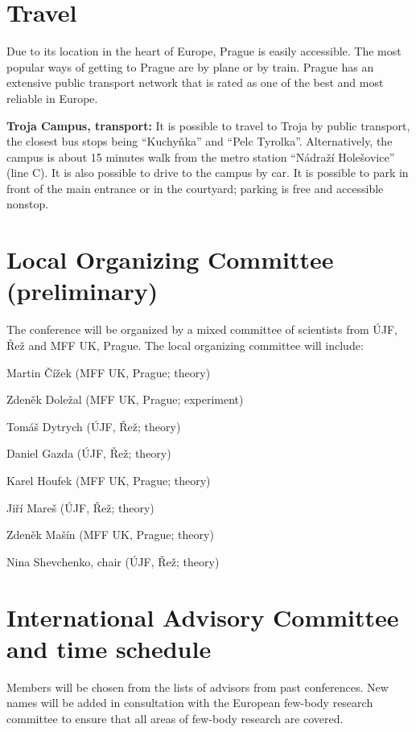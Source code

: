 \documentclass[12pt]{extarticle}
\newcommand{\dg}[1]{\todo[inline]{DG: #1}}
\newcommand*\sq{\mathbin{\vcenter{\hbox{\rule{.8ex}{.8ex}}}}}
\newenvironment{t_sq_itemize}
{\begin{itemize}[topsep=0pt, parsep=0pt, itemsep=0pt, leftmargin=*]
    \renewcommand{\labelitemi}{{\(\sq\)}}}
  {\end{itemize}}
\begin{document}
\section*{Travel}
\noindent
%
Due to its location in the heart of Europe, Prague is easily
accessible. The most popular ways of getting to Prague are by plane or
by train. Prague has an extensive public transport network that is
rated as one of the best and most reliable in Europe.

{\bf Troja Campus, transport:} It is possible to travel to Troja by public transport, the closest bus stops being “Kuchyňka”
and “Pelc Tyrolka”. Alternatively, the campus is about 15 minutes walk from the metro station “Nádraží Holešovice”
(line C). It is also possible to drive to the campus by car. It is possible to park in front of the main entrance or in the courtyard;
parking is free and accessible nonstop.


\section*{Local Organizing Committee (preliminary)}
\noindent
%
The conference will be organized by a mixed committee of scientists from ÚJF, Řež and MFF UK, Prague.
The local organizing committee will include:
\begin{t_sq_itemize}
\item Martin Čížek (MFF UK, Prague; theory)
\item Zdeněk Doležal (MFF UK, Prague; experiment)
\item Tomáš Dytrych (ÚJF, Řež; theory)
\item Daniel Gazda (ÚJF, Řež; theory)
\item Karel Houfek (MFF UK, Prague; theory)
\item Jiří Mareš (ÚJF, Řež; theory)
\item Zdeněk Mašín (MFF UK, Prague; theory)
\item Nina Shevchenko, chair (ÚJF, Řež; theory)
\end{t_sq_itemize}
\dg{Exp.\ UOCHB, JH?}

\section*{International Advisory Committee and time schedule}
\noindent
%
Members will be chosen from the lists of advisors from past conferences. New names
will be added in consultation with the European few-body research committee to ensure that all
areas of few-body research are covered. 
\end{document}
